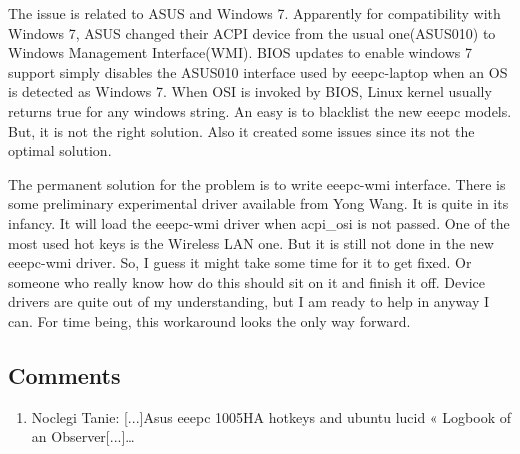 The issue is related to ASUS and Windows 7. Apparently for compatibility with Windows 7, 
ASUS changed their ACPI device from the usual one(ASUS010) to Windows Management Interface(WMI). 
BIOS updates to enable windows 7 support simply disables the ASUS010 interface used by eeepc-laptop 
when an OS is detected as Windows 7. When OSI is invoked by BIOS, Linux kernel usually returns true 
for any windows string. An easy is to blacklist the new eeepc models. But, it is not the right solution. 
Also it created some issues since its not the optimal solution.

The permanent solution for the problem is to write eeepc-wmi interface. There is some preliminary 
experimental driver available from Yong Wang. It is quite in its infancy. It will load the eeepc-wmi 
driver when acpi\_osi is not passed. One of the most used hot keys is the Wireless LAN one. 
But it is still not done in the new eeepc-wmi driver. So, I guess it might take some time 
for it to get fixed. Or someone who really know how do this should sit on it and finish it off. 
Device drivers are quite out of my understanding, but I am ready to help in anyway I can. 
For time being, this workaround looks the only way forward.


\subsection{Comments}
\begin{enumerate}
 \item Noclegi Tanie: 
[...]Asus eeepc 1005HA hotkeys and ubuntu lucid « Logbook of an Observer[...]…
\end{enumerate}

\newpage 
